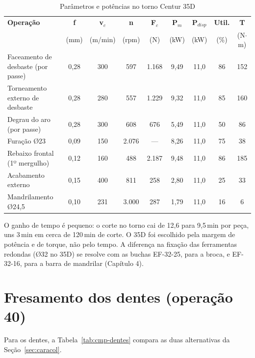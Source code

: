 \begin{table}[H]
\centering
\caption{Parâmetros e potências no torno Centur 35D}\label{tab:par-35d}
{\small\renewcommand{\arraystretch}{1.2}
\setlength{\tabcolsep}{4pt}
\begin{tabular}{|>{\raggedright\arraybackslash}p{4.4cm}|c|c|c|c|c|c|c|c|}
\hline
\rowcolor{cinza} \textbf{Operação} & \textbf{f} & \textbf{v$_c$} & \textbf{n} & \textbf{F$_c$} & \textbf{P$_m$} & \textbf{P$_{disp}$} & \textbf{Util.} & \textbf{T} \\
\rowcolor{cinza} & (mm) & (m/min) & (rpm) & (N) & (kW) & (kW) & (\%) & (N$\cdot$m) \\ \hline
Faceamento de desbaste (por passe) & 0,28 & 300 & 597 & 1.168 & 9,49 & 11,0 & 86 & 152 \\ \hline
Torneamento externo de desbaste & 0,28 & 280 & 557 & 1.229 & 9,32 & 11,0 & 85 & 160 \\ \hline
Degrau do aro (por passe) & 0,28 & 300 & 608 & 676 & 5,49 & 11,0 & 50 & 86 \\ \hline
Furação Ø23 & 0,09 & 150 & 2.076 & --- & 8,26 & 11,0 & 75 & 38 \\ \hline
Rebaixo frontal (1º mergulho) & 0,12 & 160 & 488 & 2.187 & 9,48 & 11,0 & 86 & 185 \\ \hline
Acabamento externo & 0,15 & 400 & 811 & 258 & 2,80 & 11,0 & 25 & 33 \\ \hline
Mandrilamento Ø24,5 & 0,10 & 231 & 3.000 & 287 & 1,79 & 11,0 & 16 & 6 \\ \hline
\end{tabular}}
\end{table}

O ganho de tempo é pequeno: o corte no torno cai de 12,6 para 9,5\,min por peça, uns 3\,min em cerca de 120\,min de corte. O 35D foi escolhido pela margem de potência e de torque, não pelo tempo. A diferença na fixação das ferramentas redondas (Ø32 no 35D) se resolve com as buchas EF-32-25, para a broca, e EF-32-16, para a barra de mandrilar (Capítulo 4).

\section{Fresamento dos dentes (operação 40)}

Para os dentes, a Tabela~\ref{tab:cmp-dentes} compara as duas alternativas da Seção~\ref{sec:caracol}.

